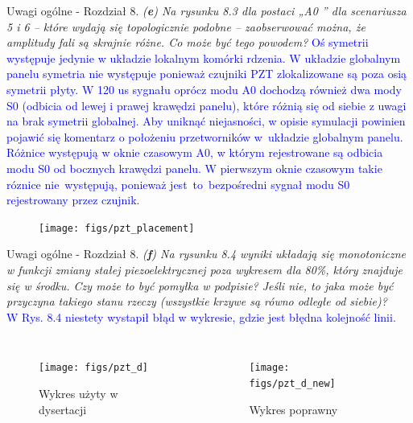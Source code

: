 \documentclass[10pt,aspectratio=169]{beamer} %
\begin{document}
\begin{frame}[label=frame36]{Uwagi ogólne - Rozdział 8.}\justifying
\textit{(\textbf{e}) Na rysunku 8.3 dla postaci „A0 ” dla scenariusza 5 i 6 – które wydają się topologicznie podobne – zaobserwować można, że amplitudy fali są skrajnie różne. Co może być tego powodem?} \textcolor{blue}{Oś symetrii występuje jedynie w układzie lokalnym komórki rdzenia. W układzie globalnym panelu symetria nie występuje ponieważ czujniki PZT zlokalizowane są poza osią symetrii płyty. W 120 us sygnału oprócz modu A0 dochodzą również dwa mody S0 (odbicia od lewej i prawej krawędzi panelu), które różnią się od siebie z uwagi na brak symetrii globalnej. Aby uniknąć niejasności, w opisie symulacji powinien pojawić się komentarz o położeniu przetworników w~układzie globalnym panelu. Różnice występują w oknie czasowym A0, w którym rejestrowane są odbicia modu S0 od bocznych krawędzi panelu. W pierwszym oknie czasowym takie róznice nie~występują, ponieważ jest~to~bezpośredni sygnał modu S0 rejestrowany przez czujnik.}
\end{frame}
\begin{frame}
	\begin{figure}
		\centering
		\texttt{[image: figs/pzt\_placement]}
	\end{figure}
\end{frame}
\begin{frame}[label=frame37]{Uwagi ogólne - Rozdział 8.}\justifying
\textit{(\textbf{f}) Na rysunku 8.4 wyniki układają się monotoniczne w funkcji zmiany stałej piezoelektrycznej poza wykresem dla 80\%, który znajduje się w środku. Czy może to być pomyłka w podpisie? Jeśli nie, to jaka może być przyczyna takiego stanu rzeczy (wszystkie krzywe są równo odległe od siebie)?}\\
\textcolor{blue}{W Rys. 8.4 niestety wystapił błąd w wykresie, gdzie jest błędna kolejność linii.}
\end{frame}
\begin{frame}
	\begin{columns}
		\begin{figure}
			\centering
			\caption{Wykres użyty w dysertacji}
			\texttt{[image: figs/pzt\_d]}
		\end{figure}
		\begin{figure}
			\centering
			\caption{Wykres poprawny}
			\texttt{[image: figs/pzt\_d\_new]}
		\end{figure}
	\end{columns}
\end{frame}
\end{document}
